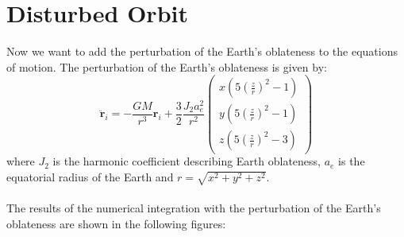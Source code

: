 \documentclass[12pt
,headinclude
,headsepline
,bibtotocnumbered
]{scrartcl}
\begin{document}
    \section*{Disturbed Orbit}
    Now we want to add the perturbation of the Earth's oblateness to the equations of motion. The perturbation of the Earth's oblateness is given by:
    \begin{equation*}
        \ddot{\textbf{r}}_i=-\frac{GM}{r^3}\textbf{r}_i+\frac{3}{2}\frac{J_2a_e^2}{r^2}\begin{pmatrix}
            x\left(5\left(\frac{z}{r}\right)^2-1\right)\\
            y\left(5\left(\frac{z}{r}\right)^2-1\right)\\
            z\left(5\left(\frac{z}{r}\right)^2-3\right)
        \end{pmatrix}
    \end{equation*}
    where $J_2$ is the harmonic coefficient describing Earth oblateness, $a_e$ is the equatorial radius of the Earth and $r=\sqrt{x^2+y^2+z^2}$.
    \\\\
    The results of the numerical integration with the perturbation of the Earth's oblateness are shown in the following figures:
\end{document}
